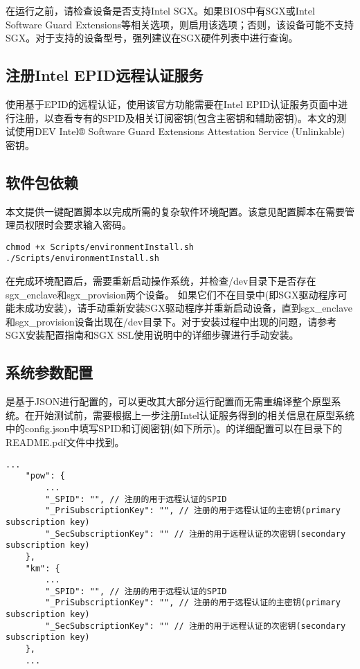 在运行\prototype 之前，请检查设备是否支持Intel SGX。如果BIOS中有SGX或Intel Software Guard Extensions等相关选项，则启用该选项；否则，该设备可能不支持SGX。对于支持的设备型号，强列建议在SGX硬件列表\cite{sgxHardware}中进行查询。

\subsection*{注册Intel EPID远程认证服务}

\prototype 使用基于EPID的远程认证，使用该官方功能需要在Intel EPID认证服务\cite{sgxEPID}页面中进行注册，以查看专有的SPID及相关订阅密钥(包含主密钥和辅助密钥)。本文的测试使用DEV Intel® Software Guard Extensions Attestation Service (Unlinkable)密钥。

\subsection*{软件包依赖}
本文提供一键配置脚本以完成\prototype 所需的复杂软件环境配置。该意见配置脚本在需要管理员权限时会要求输入密码。

\begin{lstlisting}[style=shell]
chmod +x Scripts/environmentInstall.sh
./Scripts/environmentInstall.sh
\end{lstlisting}

在完成环境配置后，需要重新启动操作系统，并检查/dev目录下是否存在sgx\_enclave和sgx\_provision两个设备。 如果它们不在目录中(即SGX驱动程序可能未成功安装)，请手动重新安装SGX驱动程序并重新启动设备，直到sgx\_enclave和sgx\_provision设备出现在/dev目录下。对于安装过程中出现的问题，请参考SGX安装配置指南\cite{sgxinstall}和SGX SSL\cite{sgxssl}使用说明中的详细步骤进行手动安装。

\subsection*{系统参数配置}

\prototype 是基于JSON进行配置的，可以更改其大部分运行配置而无需重编译整个原型系统。在开始测试前，需要根据上一步注册Intel认证服务得到的相关信息在原型系统中的config.json中填写SPID和订阅密钥(如下所示)。\prototype 的详细配置可以在\prototype 目录下的README.pdf文件中找到。

\begin{lstlisting}[style=json]
    ...
    "pow": {
        ...
        "_SPID": "", // 注册的用于远程认证的SPID
        "_PriSubscriptionKey": "", // 注册的用于远程认证的主密钥(primary subscription key)
        "_SecSubscriptionKey": "" // 注册的用于远程认证的次密钥(secondary subscription key)
    },
    "km": {
        ...
        "_SPID": "", // 注册的用于远程认证的SPID
        "_PriSubscriptionKey": "", // 注册的用于远程认证的主密钥(primary subscription key)
        "_SecSubscriptionKey": "" // 注册的用于远程认证的次密钥(secondary subscription key)
    },
    ...
\end{lstlisting}


